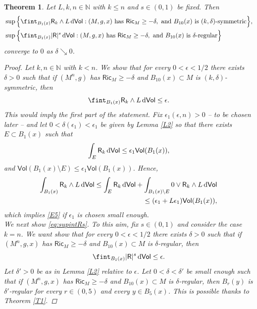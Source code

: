 \documentclass[10pt]{article}
\newtheorem{thm}{Theorem}[section]
\theoremstyle{definition}
\newcommand{\bb}[1]{\mathbb{#1}}
\newcommand{\ssf}[1]{\mathsf{#1}}
\newcommand{\Ric}{\mathsf{Ric}}
\newcommand{\R}{\mathsf{R}}
\newcommand{\de}{{\rm d}}
\begin{document}
\begin{thm} 
    Let $L,k,n \in \bb{N}$ with $k \leq n$ and $s \in (0,1)$ be fixed. Then 
    \begin{align}
    &\sup \Big\{\fint_{B_1(x)} \R_{k} \wedge L \, \de \ssf{Vol} : (M,g,x) \text{ has } \Ric_{M} \geq -\delta, \text{ and } B_{10}(x) \text{ is  $(k,\delta)$-symmetric} 
    \Big\} ,
    \\
    &  \sup \Big\{\fint_{B_1(x)} |\R|^s \, \de \ssf{Vol} : (M,g,x) \text{ has } \Ric_{M} \geq -\delta, \text{ and } B_{10}(x) \text{ is } \delta \text{-regular} 
    \Big\}  \label{eq:supintRs}
    \end{align}
    converge to $0$ as $\delta \searrow 0$. 
    \begin{proof}
    Let $k,n \in \bb{N}$ with $k < n$.  We show that for every $0<\epsilon <1/2$ there exists $\delta>0$ such that if $(M^n,g)$ has $\Ric_M \geq -\delta$ and $B_{10}(x) \subset M$ is $(k,\delta)$-symmetric, then
    \begin{equation} \label{E5}
    \fint_{B_1(x)} \R_k \wedge L \,\de\ssf{Vol} \leq  \epsilon.
    \end{equation}
    This would imply the first part of the statement.
     Fix $\epsilon_1(\epsilon,n)>0$ -- to be chosen later -- and let $0<\delta(\epsilon_1)<\epsilon_1$ be given by Lemma \ref{L2} so that there exists $E \subset B_1(x)$ such that
        \[
         \int_{E} \R_k \,\de\ssf{Vol} \leq \epsilon_1 \ssf{Vol}(B_1(x)),
        \]
        and $\ssf{Vol}(B_1(x) \setminus E) \leq \epsilon_1 \ssf{Vol}(B_1(x))$.
    Hence,
    \begin{align*}
    \int_{B_1(x)} \R_k \wedge L \,\de\ssf{Vol}  \leq \int_{E} \R_k  \,\de\ssf{Vol}+\int_{B_1(x) \setminus E} 0 \vee \R_k \wedge L \,\de\ssf{Vol} \\
    \leq 
    (\epsilon_1+L\epsilon_1 )\ssf{Vol}(B_1(x)),
    \end{align*}
    which implies \eqref{E5} if $\epsilon_1$ is chosen small enough.
\\
We next show \eqref{eq:supintRs}. To this aim, fix $s \in (0,1)$ and consider the case  $k=n$.
    We want show that for every $0<\epsilon <1/2$ there exists $\delta>0$ such that if $(M^n,g,x)$ has $\Ric_M \geq -\delta$ and $B_{10}(x) \subset M$ is $\delta$-regular, then
    \[
    \fint_{B_1(x)} |\R|^s \,\de\ssf{Vol} \leq  \epsilon.
    \]
    Let $\delta'>0$ be as in Lemma \ref{L2} relative to $\epsilon$.
        Let $0<\delta<\delta'$ be small enough such that if $(M^n,g,x)$ has $\Ric_M \geq -\delta$ and $B_{10}(x) \subset M$ is $\delta$-regular, then $B_r(y)$ is $\delta'$-regular for every $r \in (0,5)$ and every $y \in B_5(x)$. This is possible thanks to Theorem \ref{T1}. 

\end{proof}
\end{thm}
\end{document}
